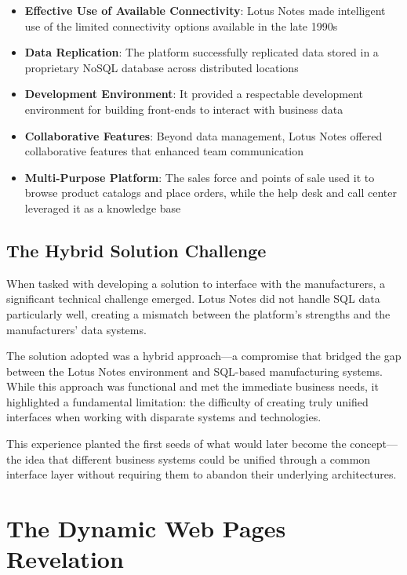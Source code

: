 \begin{itemize}
\item \textbf{Effective Use of Available Connectivity}: Lotus Notes made intelligent use of the limited connectivity options available in the late 1990s
\item \textbf{Data Replication}: The platform successfully replicated data stored in a proprietary NoSQL database across distributed locations
\item \textbf{Development Environment}: It provided a respectable development environment for building front-ends to interact with business data
\item \textbf{Collaborative Features}: Beyond data management, Lotus Notes offered collaborative features that enhanced team communication
\item \textbf{Multi-Purpose Platform}: The sales force and points of sale used it to browse product catalogs and place orders, while the help desk and call center leveraged it as a knowledge base
\end{itemize}

\subsection{The Hybrid Solution Challenge}

When tasked with developing a solution to interface with the manufacturers, a significant technical challenge emerged. Lotus Notes did not handle SQL data particularly well, creating a mismatch between the platform's strengths and the manufacturers' data systems.

The solution adopted was a hybrid approach—a compromise that bridged the gap between the Lotus Notes environment and SQL-based manufacturing systems. While this approach was functional and met the immediate business needs, it highlighted a fundamental limitation: the difficulty of creating truly unified interfaces when working with disparate systems and technologies.

This experience planted the first seeds of what would later become the \webbaselet{} concept—the idea that different business systems could be unified through a common interface layer without requiring them to abandon their underlying architectures.

\section{The Dynamic Web Pages Revelation}

